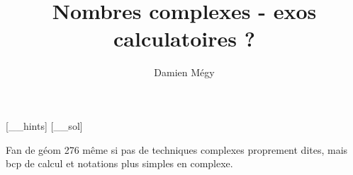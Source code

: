 




[_\jobname_hints]
[_\jobname_sol]


\title{Nombres complexes - exos calculatoires ?}
\author{Damien Mégy}
\maketitle

\avertissement 

Fan de géom 276 même si pas de techniques complexes proprement dites, mais bcp de calcul et notations plus simples en complexe.

\indications
\correction



